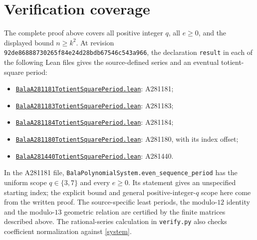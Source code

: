 \documentclass[11pt]{article}
\begin{document}
\section{Verification coverage}
The complete proof above covers all positive integer $q$, all $e\geq0$,
and the displayed bound $n\geq k^2$.
At revision \texttt{92de86888730265f84e24d28bdb67546c543a966},
the declaration \texttt{result} in each of the following Lean files
gives the source-defined series and an eventual totient-square period:
\begin{itemize}
\item \href{https://github.com/the-omega-institute/trureturing/blob/92de86888730265f84e24d28bdb67546c543a966/D5/S1/Recurrence/Periodic/BalaA281181TotientSquarePeriod.lean}{\texttt{BalaA281181TotientSquarePeriod.lean}}: A281181;
\item \href{https://github.com/the-omega-institute/trureturing/blob/92de86888730265f84e24d28bdb67546c543a966/D5/S1/Recurrence/Periodic/BalaA281183TotientSquarePeriod.lean}{\texttt{BalaA281183TotientSquarePeriod.lean}}: A281183;
\item \href{https://github.com/the-omega-institute/trureturing/blob/92de86888730265f84e24d28bdb67546c543a966/D5/S1/Recurrence/Periodic/BalaA281184TotientSquarePeriod.lean}{\texttt{BalaA281184TotientSquarePeriod.lean}}: A281184;
\item \href{https://github.com/the-omega-institute/trureturing/blob/92de86888730265f84e24d28bdb67546c543a966/D5/S1/Recurrence/Periodic/BalaA281180TotientSquarePeriod.lean}{\texttt{BalaA281180TotientSquarePeriod.lean}}: A281180, with its index offset;
\item \href{https://github.com/the-omega-institute/trureturing/blob/92de86888730265f84e24d28bdb67546c543a966/D5/S1/Recurrence/Periodic/BalaA281440TotientSquarePeriod.lean}{\texttt{BalaA281440TotientSquarePeriod.lean}}: A281440.
\end{itemize}
In the A281181 file, \texttt{BalaPolynomialSystem.even\_sequence\_period}
has the uniform scope $q\in\{3,7\}$ and every $e\geq0$.
Its statement gives an unspecified starting index; the explicit bound
and general positive-integer-$q$ scope here come from the written proof.
The source-specific least periods, the modulo-$12$ identity and the
modulo-$13$ geometric relation are certified by the finite matrices
described above. The rational-series calculation in \texttt{verify.py}
also checks coefficient normalization against \eqref{system}.
\end{document}
